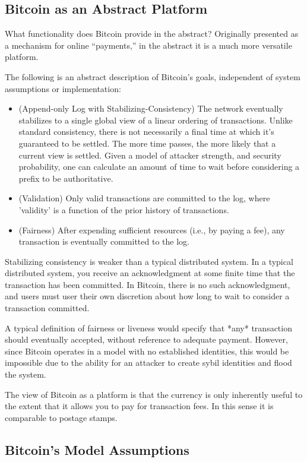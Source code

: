 \subsection{Bitcoin as an Abstract Platform}

What functionality does Bitcoin provide in the abstract? Originally presented as a mechanism for online ``payments,'' in the abstract it is a much more versatile platform.

The following is an abstract description of Bitcoin's goals, independent of system assumptions or implementation:
\begin{itemize}
\item (Append-only Log with Stabilizing-Consistency) The network eventually stabilizes to a single global view of a linear ordering of transactions. Unlike standard consistency, there is not necessarily a final time at which it's guaranteed to be settled. The more time passes, the more likely that a current view is settled. Given a model of attacker strength, and security probability, one can calculate an amount of time to wait before considering a prefix to be authoritative.
\item (Validation) Only valid transactions are committed to the log, where 'validity' is a function of the prior history of transactions.
\item (Fairness) After expending sufficient resources (i.e., by paying a fee), any transaction is eventually committed to the log.
\end{itemize}

Stabilizing consistency is weaker than a typical distributed system. In a typical distributed system, you receive an acknowledgment at some finite time that the transaction has been committed. In Bitcoin, there is no such acknowledgment, and users must user their own discretion about how long to wait to consider a transaction committed.

A typical definition of fairness or liveness would specify that *any* transaction should eventually accepted, without reference to adequate payment. However, since Bitcoin operates in a model with no established identities, this would be impossible due to the ability for an attacker to create sybil identities and flood the system.

The view of Bitcoin as a platform is that the currency is only inherently useful to the extent that it allows you to pay for transaction fees. In this sense it is comparable to postage stamps.

\subsection{Bitcoin's Model Assumptions}

